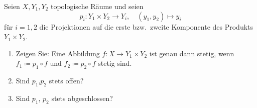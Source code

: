 \newpage
\begin{assignment}
  Seien \( X, Y_1, Y_2 \) topologische Räume und seien
  \begin{equation*}
    p_i: Y_1 \times Y_2 \to Y_i, \quad (y_1,y_2) \mapsto y_i
  \end{equation*}
  für \( i = 1,2 \) die Projektionen auf die erste bzw.\ zweite Komponente des Produkts \( Y_1 \times Y_2 \).
  \begin{enumerate}[label= (\alph*)]
    \item Zeigen Sie: Eine Abbildung \( f: X \to Y_1 \times Y_2 \) ist genau dann stetig, wenn \( f_1 \coloneqq p_1 \circ f \) und \( f_2 \coloneqq p_2 \circ f \) stetig sind.
    \item Sind \( p_1 \),\( p_2 \) stets offen?
    \item Sind \( p_1 \), \( p_2 \) stets abgeschlossen?
  \end{enumerate}
\end{assignment}
